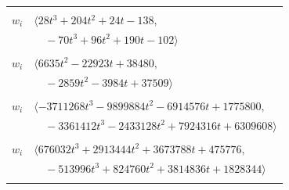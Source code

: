 \documentclass[11pt]{article}
\begin{document}
\begin{longtable}{@{}ll@{}}
\addlinespace[2pt]
\multicolumn{2}{@{}p{0.97\textwidth}@{}}{$i=24$, $D_i=1$, $\rho_{ij}$: $9{:}2, \allowbreak 10{:}2, \allowbreak 16{:}1, \allowbreak 18{:}2, \allowbreak 37{:}2, \allowbreak 38{:}2, \allowbreak 51{:}1, \allowbreak 56{:}1, \allowbreak 60{:}1$}\\
$w_i$ & $\langle 28t^{3}+204t^{2}+24t-138,$\\
 & $\quad -70t^{3}+96t^{2}+190t-102\rangle$\\
\addlinespace[2pt]
\multicolumn{2}{@{}p{0.97\textwidth}@{}}{$i=25$, $D_i=1$, $\rho_{ij}$: $10{:}1, \allowbreak 12{:}1, \allowbreak 21{:}1, \allowbreak 23{:}2, \allowbreak 34{:}2, \allowbreak 39{:}1, \allowbreak 40{:}2, \allowbreak 41{:}1, \allowbreak 43{:}2, \allowbreak 47{:}2, \allowbreak 48{:}2, \allowbreak 55{:}1, \allowbreak 57{:}1, \allowbreak 58{:}1, \allowbreak 60{:}2, \allowbreak 61{:}2, \allowbreak 62{:}2$}\\
$w_i$ & $\langle 6635t^{2}-22923t+38480,$\\
 & $\quad -2859t^{2}-3984t+37509\rangle$\\
\addlinespace[2pt]
\multicolumn{2}{@{}p{0.97\textwidth}@{}}{$i=26$, $D_i=1$, $\rho_{ij}$: $2{:}2, \allowbreak 5{:}2, \allowbreak 8{:}2, \allowbreak 14{:}1, \allowbreak 28{:}1, \allowbreak 32{:}1, \allowbreak 38{:}2, \allowbreak 40{:}2, \allowbreak 55{:}2, \allowbreak 57{:}1, \allowbreak 60{:}2, \allowbreak 68{:}2, \allowbreak 73{:}1, \allowbreak 76{:}2, \allowbreak 88{:}1, \allowbreak 91{:}2, \allowbreak 96{:}1, \allowbreak 97{:}2$}\\
$w_i$ & $\langle -3711268t^{3}-9899884t^{2}-6914576t+1775800,$\\
 & $\quad -3361412t^{3}-2433128t^{2}+7924316t+6309608\rangle$\\
\addlinespace[2pt]
\multicolumn{2}{@{}p{0.97\textwidth}@{}}{$i=27$, $D_i=1$, $\rho_{ij}$: $2{:}1, \allowbreak 5{:}1, \allowbreak 9{:}1, \allowbreak 15{:}2, \allowbreak 22{:}1, \allowbreak 39{:}1, \allowbreak 46{:}2, \allowbreak 49{:}1, \allowbreak 55{:}1, \allowbreak 61{:}1, \allowbreak 62{:}2, \allowbreak 64{:}1, \allowbreak 67{:}1, \allowbreak 72{:}2, \allowbreak 80{:}2, \allowbreak 82{:}2, \allowbreak 84{:}1, \allowbreak 93{:}2$}\\
$w_i$ & $\langle 676032t^{3}+2913444t^{2}+3673788t+475776,$\\
 & $\quad -513996t^{3}+824760t^{2}+3814836t+1828344\rangle$\\
\addlinespace[2pt]
\multicolumn{2}{@{}p{0.97\textwidth}@{}}{$i=28$, $D_i=1$, $\rho_{ij}$: $2{:}1, \allowbreak 26{:}2, \allowbreak 47{:}2, \allowbreak 54{:}2$}\\

\end{longtable}
\end{document}
